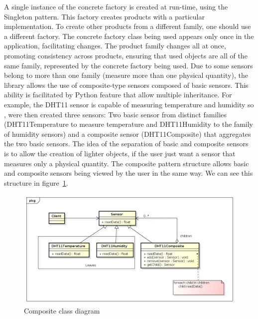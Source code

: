 \documentclass{acm_proc_article-sp}
\begin{document}
A single instance of the concrete factory is created at run-time, using the Singleton pattern. This factory creates products with a particular implementation. To create other products from a different family, one should use a different factory. The concrete factory class being used appears only once in the application, facilitating changes. The product family changes all at once, promoting consistency across products, ensuring that used objects are all of the same family, represented by the concrete factory being used.
\newline
\newline
Due to some sensors belong to more than one family (measure more than one physical quantity), the library allows the use of composite-type sensors composed of basic sensors. This ability is facilitated by Python feature that allow multiple inheritance. For example, the DHT11 sensor is capable of measuring temperature and humidity so , were then created three sensors: Two basic sensor from distinct families (DHT11Temperature to measure temperature and DHT11Humidity to the family of humidity sensors) and a composite sensor (DHT11Composite) that aggregates the two basic sensors. The idea of the separation of basic and composite sensors is to allow the creation of lighter objects, if the user just want a sensor that measures only a physical quantity. The composite pattern structure allows basic and composite sensors being viewed by the user in the same way. We can see this structure in figure~\ref{fig:composite}.
\newline
\begin{figure}[ht]
\centering
    \includegraphics[width=1.0\textwidth,natwidth=610,natheight=642]{pictures/composite.png}
    \caption{Composite class diagram}
    \label{fig:composite}
\end{figure}
\end{document}
